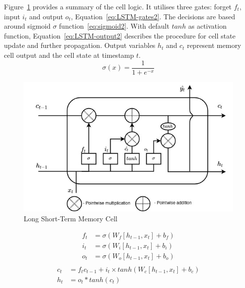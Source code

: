 {\mbox{Figure~\ref{fig:LSTM-cell2}} provides a summary of the cell logic.
It utilises three gates: forget $f_t$, input $i_t$ and output $o_t$, \mbox{Equation~\ref{eq:LSTM-gates2}}.
The decisions are based around sigmoid $\sigma$ function~\ref{eq:sigmoid2}.
With default $tanh$ as activation function, \mbox{Equation~\ref{eq:LSTM-output2}} describes the procedure for cell state update and further propagation.
Output variables $h_t$ and $c_t$ represent memory cell output and the cell state at timestamp $t$.
\begin{equation}
    \sigma(x) = \frac{1}{1+e^{-x}}
    \label{eq:sigmoid2}
\end{equation}
\begin{figure}[htbp]
    \centering
    \includegraphics[width=\linewidth]{II_Body/LSTM/images/LSTM.jpg}
    \caption{Long Short-Term Memory Cell}
    \label{fig:LSTM-cell2}
\end{figure}
\begin{equation}
    \begin{split}
        f_t &= \sigma \left(W_f \left[h_{t-1}, x_t \right] + b_f \right) \\
        i_t &= \sigma \left(W_i \left[h_{t-1}, x_t \right] + b_i \right) \\
        o_t &= \sigma \left(W_o \left[h_{t-1}, x_t \right] + b_o \right) \\    
    \end{split}
    \label{eq:LSTM-gates2}
\end{equation}
\begin{equation}
    \begin{split}
        c_t &= f_t c_{t-1}+i_t \times tanh \left(W_c \left[h_{t-1}, x_t \right] + b_c \right) \\
        h_t &= o_t*tanh \left(c_t \right)
    \end{split}
    \label{eq:LSTM-output2}
\end{equation}
}

